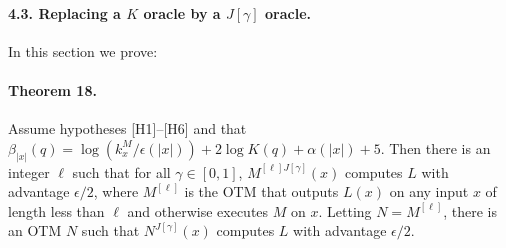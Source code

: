 \paragraph{4.3. Replacing a $K$ oracle by a $J[\gamma]$ oracle.}
In this section we prove:
\paragraph{Theorem 18.}
Assume hypotheses [H1]--[H6] and that $\beta_{|x|}(q)=\log(k_x^M/\epsilon(|x|))+2\log K(q)+\alpha(|x|)+5$. Then there is an integer $\ell$ such that for all $\gamma\in[0,1]$, $M^{[\ell]J[\gamma]}(x)$ computes $L$ with advantage $\epsilon/2$, where $M^{[\ell]}$ is the OTM that outputs $L(x)$ on any input $x$ of length less than $\ell$ and otherwise executes $M$ on $x$. Letting $N=M^{[\ell]}$, there is an OTM $N$ such that $N^{J[\gamma]}(x)$ computes $L$ with advantage $\epsilon/2$.
